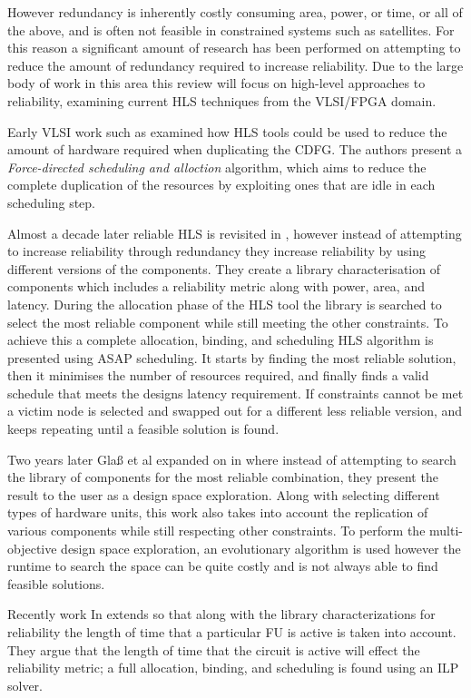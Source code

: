 However redundancy is inherently costly consuming area, power, or time, or all of the above, and is
often not feasible in constrained systems such as satellites.
For this reason a significant amount of research has been performed on attempting to reduce the amount of
redundancy required to increase reliability.
Due to the large body of work in this area this review will focus on high-level
approaches to reliability, examining current HLS techniques from the VLSI/FPGA domain.

Early VLSI work such as \cite{antola1998high} examined how HLS tools could be used to reduce the
amount of hardware required when duplicating the CDFG.
The authors present a \emph{Force-directed scheduling and alloction} algorithm, which aims to
reduce the complete duplication of the resources by exploiting ones that are idle in each
scheduling step.

Almost a decade later reliable HLS is revisited in \cite{tosun2005reliability}, however instead of
attempting to increase reliability through redundancy they increase reliability by using different versions
of the components.
They create a library characterisation of components which includes a reliability metric along with
power, area, and latency.
During the allocation phase of the HLS tool the library is searched to select the most reliable component
while still meeting the other constraints.
To achieve this a complete allocation, binding, and scheduling HLS algorithm is presented using ASAP scheduling.
It starts by finding the most reliable solution, then it minimises the number of resources required,
and finally finds a valid schedule that meets the designs latency requirement.
If constraints cannot be met a victim node is selected and swapped out for a different less reliable
version, and keeps repeating until a feasible solution is found.

Two years later Gla{\ss} et al expanded on \cite{tosun2005reliability} in \cite{glass2007interactive} where instead of
attempting to search the library of components for the most reliable combination, they present the result to the
user as a design space exploration.
Along with selecting different types of hardware units, this work also takes into account the replication of various
components while still respecting other constraints.
To perform the multi-objective design space exploration, an evolutionary algorithm is used however the runtime to
search the space can be quite costly and is not always able to find feasible solutions.

Recently work In \cite{hara2013cost} extends \cite{tosun2005reliability}
so that along with the library characterizations for reliability the length of time that a particular FU is active is taken into account.
They argue that the length of time that the circuit is active will effect the reliability metric;
a full allocation, binding, and scheduling is found using an ILP solver.

